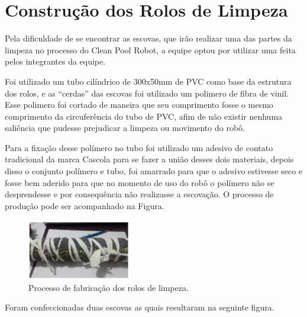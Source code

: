 \section{Construção dos Rolos de Limpeza}
Pela dificuldade de se encontrar as escovas, que irão realizar uma das partes da limpeza no processo do Clean Pool Robot, a equipe optou por utilizar uma feita pelos integrantes da equipe.

Foi utilizado um tubo cilíndrico de 300x50mm de PVC como base da estrutura dos rolos, e as “cerdas” das escovas foi  utilizado um polimero de fibra de vinil. Esse polimero foi cortado de maneira que seu comprimento fosse o mesmo comprimento da circuferência do tubo de PVC, afim de não existir nenhuma saliência que pudesse prejudicar a limpeza ou movimento do robô.
	
Para a fixação desse polímero no tubo foi utilizado um adesivo de contato tradicional da marca Cascola para se fazer a união desses dois materiais, depois disso o conjunto polímero e tubo, foi amarrado para que o adesivo estivesse seco e fosse bem aderido para que no momento de uso do robô o polímero não se desprendesse e por consequência não realizasse a escovação. O processo de produção pode ser acompanhado na Figura.

\par
\begin{figure}[h]
  \centering
  \includegraphics[width=0.4\textwidth]{figures/rolo.png}
  \caption{Processo de fabricação dos rolos de limpeza.}
  \label{fig:rolo}
\end{figure}
\FloatBarrier
\par

Foram confeccionadas duas escovas as quais resultaram na seguinte figura.

